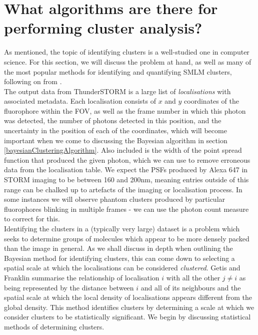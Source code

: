 \documentclass[11pt]{article}
\begin{document}
\section{What algorithms are there for performing cluster analysis?}

As mentioned, the topic of identifying clusters is a well-studied one in computer science. For this section, we will discuss the problem at hand, as well as many of the most popular methods for identifying and quantifying SMLM clusters, following on from \cite{Khater2020}. \\

The output data from ThunderSTORM is a large list of \textit{localisations} with associated metadata. Each localisation consists of $x$ and $y$ coordinates of the fluorophore within the FOV, as well as the frame number in which this photon was detected, the number of photons detected in this position, and the uncertainty in the position of each of the coordinates, which will become  important when we come to discussing the Bayesian algorithm in section \ref{bayesianClusteringAlgorithm}. Also included is the width of the point spread function that produced the given photon, which we can use to remove erroneous data from the localisation table. We expect the PSFs produced by Alexa 647 in STORM imaging to be between 160 and 200nm\cite{thunderstorm}, meaning entries outside of this range can be chalked up to artefacts of the imaging or localisation process. In some instances we will observe phantom clusters produced by particular fluorophores blinking in multiple frames - we can use the photon count measure to correct for this. \\

Identifying the clusters in a (typically very large) dataset is a problem which seeks to determine groups of molecules which appear to be more densely packed than the image in general. 
As we shall discuss in depth when outlining the Bayesian method for identifying clusters, this can come down to selecting a spatial scale at which the localisations can be considered \textit{clustered}. 
Getis and Franklin \cite{getisAndFranklin} summarise the relationship of localisation $i$ with all the other $j \neq i $ as being represented by the distance between $i$ and all of its neighbours and the spatial scale at which the local density of localisations appears different from the global density. This method identifies clusters by determining a scale at which we consider clusters to be statistically significant. We begin by discussing statistical methods of determining clusters.\\
\end{document}
